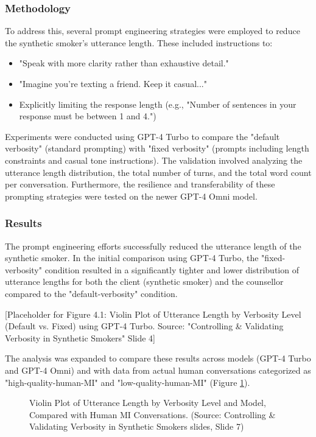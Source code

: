 \subsubsection{Methodology}

To address this, several prompt engineering strategies were employed to reduce the synthetic smoker's utterance length. These included instructions to:
\begin{itemize}
    \item "Speak with more clarity rather than exhaustive detail."
    \item "Imagine you're texting a friend. Keep it casual..."
    \item Explicitly limiting the response length (e.g., "Number of sentences in your response must be between 1 and 4.")
\end{itemize}
Experiments were conducted using GPT-4 Turbo to compare the "default verbosity" (standard prompting) with "fixed verbosity" (prompts including length constraints and casual tone instructions). The validation involved analyzing the utterance length distribution, the total number of turns, and the total word count per conversation. Furthermore, the resilience and transferability of these prompting strategies were tested on the newer GPT-4 Omni model.

\subsubsection{Results}

The prompt engineering efforts successfully reduced the utterance length of the synthetic smoker. In the initial comparison using GPT-4 Turbo, the "fixed-verbosity" condition resulted in a significantly tighter and lower distribution of utterance lengths for both the client (synthetic smoker) and the counsellor compared to the "default-verbosity" condition.

[Placeholder for Figure 4.1: Violin Plot of Utterance Length by Verbosity Level (Default vs. Fixed) using GPT-4 Turbo. Source: "Controlling \& Validating Verbosity in Synthetic Smokers" Slide 4]

The analysis was expanded to compare these results across models (GPT-4 Turbo and GPT-4 Omni) and with data from actual human conversations categorized as "high-quality-human-MI" and "low-quality-human-MI" (Figure \ref{fig:verbosity_utterance_length}).

\begin{figure}[h]
    \centering
    \caption{Violin Plot of Utterance Length by Verbosity Level and Model, Compared with Human MI Conversations. (Source: Controlling \& Validating Verbosity in Synthetic Smokers slides, Slide 7)}
    \label{fig:verbosity_utterance_length}
\end{figure}

